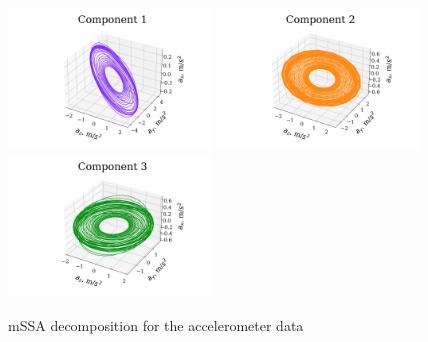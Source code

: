\documentclass[referee, pdflatex, sn-mathphys-num]{sn-jnl}
\theoremstyle{definition}
\theoremstyle{plain}
\begin{document}
	\begin{figure}[h]
		\centering
		\includegraphics[width=0.48\textwidth, keepaspectratio]{acceler_1_mssa.png}
		\includegraphics[width=0.48\textwidth, keepaspectratio]{acceler_2_mssa.png}
		\includegraphics[width=0.48\textwidth, keepaspectratio]{acceler_3_mssa.png}
		\caption{mSSA decomposition for the accelerometer data}\label{fig:accel_decomp_mssa}
	\end{figure}
	
\end{document}
